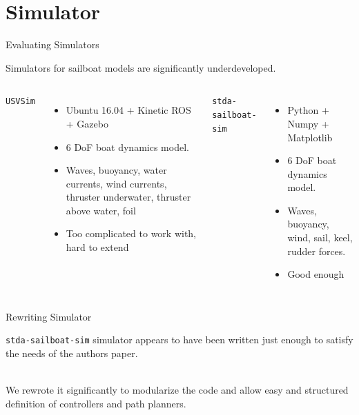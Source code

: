 \documentclass[10pt,xcolor={table,dvipsnames},t]{beamer}
\begin{document}
\section{Simulator}
\begin{frame}{Evaluating Simulators}
    
    
    Simulators for sailboat models are significantly underdeveloped.
    
    \begin{columns}
        \centerline{\texttt{USVSim} \cite{Paravisi2019}}
        \begin{itemize}
            \item Ubuntu 16.04 + Kinetic ROS + Gazebo
            \item 6 DoF boat dynamics model.
            \item Waves, buoyancy, water currents, wind currents, thruster underwater, thruster above water, foil
            \item Too complicated to work with, hard to extend
        \end{itemize}
        \centerline{\texttt{stda-sailboat-sim} \cite{Buehler2018}}
        \begin{itemize}
            \item Python + Numpy + Matplotlib
            \item 6 DoF boat dynamics model.
            \item Waves, buoyancy, wind, sail, keel, rudder forces.
            \item Good enough 
        \end{itemize}
    \end{columns}
    
\end{frame}



\begin{frame}{Rewriting Simulator}

    \texttt{stda-sailboat-sim} simulator appears to have been written just enough to satisfy the needs of the authors paper.
    
    \hfill\\
    We rewrote it significantly to modularize the code and allow easy and structured definition
    of controllers and path planners.

\end{frame}

\end{document}
